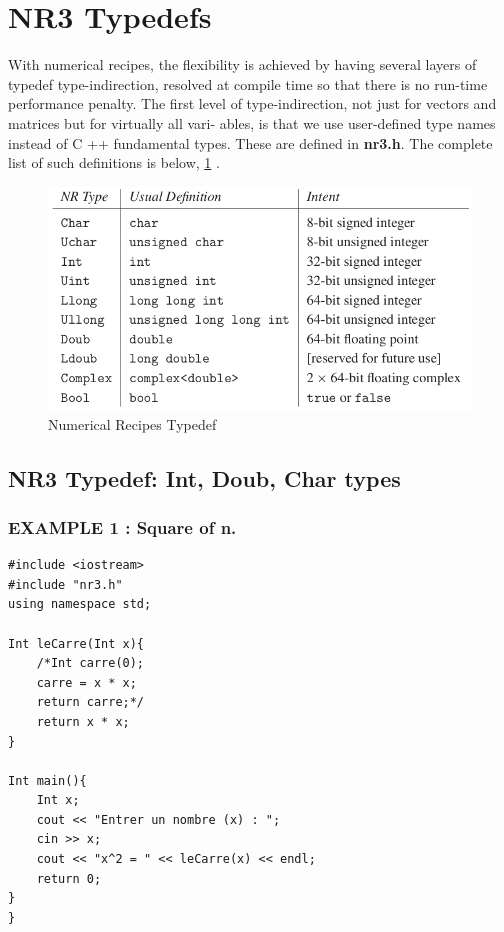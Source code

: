 \documentclass[12pt]{report}
\begin{document}
\section{NR3 Typedefs}
With numerical recipes, the flexibility is achieved by having several layers of typedef type-indirection,
resolved at compile time so that there is no run-time performance penalty. The first
level of type-indirection, not just for vectors and matrices but for virtually all vari-
ables, is that we use user-defined type names instead of C ++ fundamental types.
These are defined in \textbf{nr3.h}. The
complete list of such definitions is below, \ref{fig:NRTypedef} \cite{nr3ed}.

\begin{figure}[!htbp]
	\centering
	\includegraphics[width=1.\linewidth]{NR_Typedef.png}
	\caption{Numerical Recipes Typedef}
	\label{fig:NRTypedef}
\end{figure}

\subsection{NR3 Typedef: Int, Doub, Char types} 

\subsubsection{EXAMPLE 1 : Square of n.}

\begin{lstlisting}[style=CStyle]
#include <iostream>
#include "nr3.h"
using namespace std;

Int leCarre(Int x){
	/*Int carre(0);
	carre = x * x;
	return carre;*/
	return x * x;
}

Int main(){
	Int x;
	cout << "Entrer un nombre (x) : ";
	cin >> x;
	cout << "x^2 = " << leCarre(x) << endl;
	return 0; 
}
}
\end{lstlisting}
\end{document}
